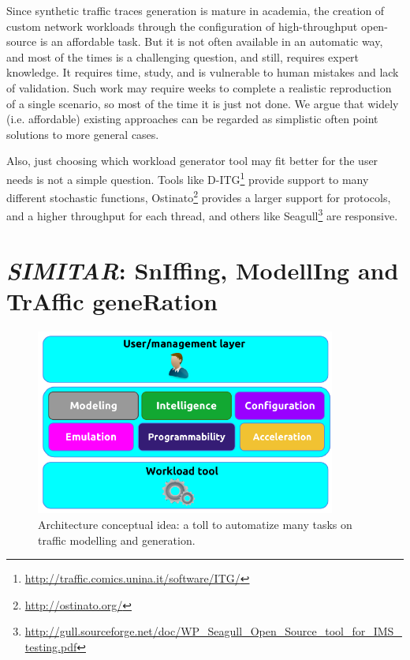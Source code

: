 Since synthetic traffic traces generation is mature in academia, the creation of custom network workloads through the configuration of high-throughput open-source is an affordable task. But it is not often available in an automatic way, and most of the times is a challenging question\cite{legotg-paper}, and still, requires expert knowledge. It requires time, study, and is vulnerable to human mistakes and lack of validation. Such work may require weeks to complete a realistic reproduction of a single scenario, so most of the time it is just not done. We argue that widely (i.e. affordable) existing approaches can be regarded as simplistic often point solutions to more general cases. 


Also, just choosing which workload generator tool may fit better for the user needs is not a simple question. Tools like D-ITG\footnote{\href{http://traffic.comics.unina.it/software/ITG/}{http://traffic.comics.unina.it/software/ITG/}} provide support to many different stochastic functions, Ostinato\footnote{\href{http://ostinato.org/}{http://ostinato.org/}} provides a larger support for protocols, and a higher throughput for each thread\cite{comparative-trafficgen-tools}, and others like Seagull\footnote{\href{http://gull.sourceforge.net/doc/WP_Seagull_Open_Source_tool_for_IMS_testing.pdf}{http://gull.sourceforge.net/doc/WP\_Seagull\_Open\_Source\_tool\_for\_IMS\_testing.pdf}} are responsive. 


\section{\textit{SIMITAR}: SnIffing, ModellIng and TrAffic geneRation}

\begin{figure}[ht!]
        \centering
        \includegraphics[height=2.4in]{figures/ch1/layer-diagram}
        \caption{ Architecture conceptual idea: a toll to automatize many tasks on traffic modelling and generation.}
    \label{fig:layer-diagram}
\end{figure}



